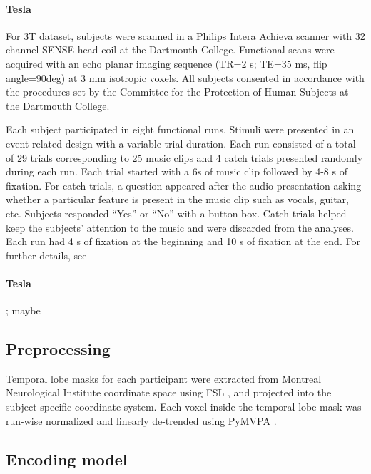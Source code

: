 \paragraph{\unit[3]{Tesla}}
%
For 3T dataset, subjects were scanned in a Philips Intera Achieva scanner with 32 channel SENSE
head coil at the Dartmouth College. Functional scans were acquired with an echo planar imaging
sequence (TR=2 s; TE=35 ms, flip angle=90deg) at 3 mm isotropic voxels.
All subjects consented in accordance with the procedures set by the
Committee for the Protection of Human Subjects at the Dartmouth College. 

Each subject participated in eight functional runs. Stimuli were presented in an event-related design with a variable trial duration. Each run consisted of a total of 29 trials corresponding to 25 music clips and 4 catch trials presented randomly during each run. Each trial started with a 6s of music clip followed by 4-8 s of fixation. For catch trials, a question appeared after the audio presentation asking whether a particular feature is present in the music clip such as vocals, guitar, etc. Subjects responded “Yes” or “No” with a button box. Catch trials helped keep the subjects’ attention to the music and were discarded from the analyses. Each run had 4 s of fixation at the beginning and 10 s of fixation at the end. For further details, see \citep{CTK+2012}

%

\paragraph{\unit[7]{Tesla}}
%
\citet{HDH+2015}; maybe \citet{HBI+14}


\subsection*{Preprocessing}

Temporal lobe masks for each participant were extracted from Montreal
Neurological Institute coordinate space using FSL \citep{SJB+04,JBB+12}, and
projected into the subject-specific coordinate system.
Each voxel inside the temporal lobe mask was run-wise normalized and linearly
de-trended using PyMVPA \citep{HHS09b}. 

\subsection*{Encoding model}

